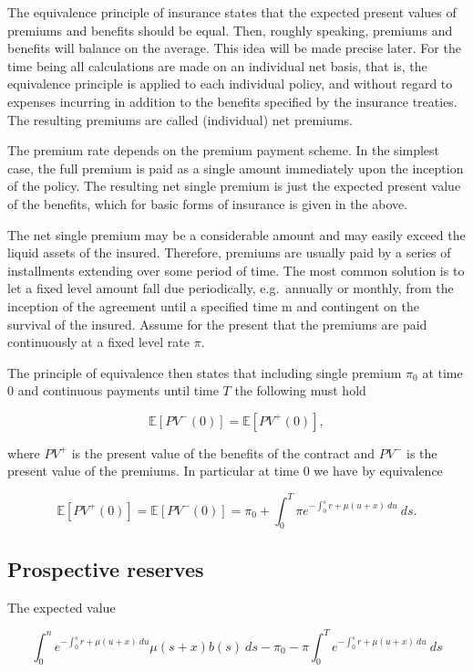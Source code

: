 \documentclass[a4paper,10pt,openany]{book}
\begin{document}
The equivalence principle of insurance states that the expected present values of premiums and benefits should be equal. Then, roughly speaking, premiums and benefits will balance on the average. This idea will be made precise later. For the time being all calculations are made on an individual net basis, that is, the equivalence principle is applied to each individual policy, and without regard to expenses incurring in addition to the benefits specified by the insurance treaties. The resulting premiums are called (individual) net premiums.

The premium rate depends on the premium payment scheme. In the simplest case, the full premium is paid as a single amount immediately upon the inception of the policy. The resulting net single premium is just the expected present value of the benefits, which for basic forms of insurance is given in the above.

The net single premium may be a considerable amount and may easily exceed the liquid assets of the insured. Therefore, premiums are usually paid by a series of installments extending over some period of time. The most common solution is to let a fixed level amount fall due periodically, e.g.~annually or monthly, from the inception of the agreement until a specified time m and contingent on the survival of the insured. Assume for the present that the premiums are paid continuously at a fixed level rate \(\pi\).

The principle of equivalence then states that including single premium \(\pi_0\) at time 0 and continuous payments until time \(T\) the following must hold

\[
\mathbb E[PV^-(0)]=\mathbb E[PV^+(0)],
\]

where \(PV^+\) is the present value of the benefits of the contract and \(PV^-\) is the present value of the premiums. In particular at time 0 we have by equivalence

\[
\mathbb E[PV^+(0)]=\mathbb E[PV^-(0)]=\pi_0+\int_0^T\pi e^{-\int_0^sr+\mu(u+x)\ du}\ ds.
\]

\hypertarget{prospective-reserves}{%
\subsection{Prospective reserves}\label{prospective-reserves}}

The expected value

\[
\int_0^ne^{-\int_0^s r+\mu(u+x)\ du}\mu(s+x)b(s)\ ds-\pi_0-\pi\int_0^Te^{-\int_0^s r+\mu(u+x)\ du}\ ds
\]
\end{document}
